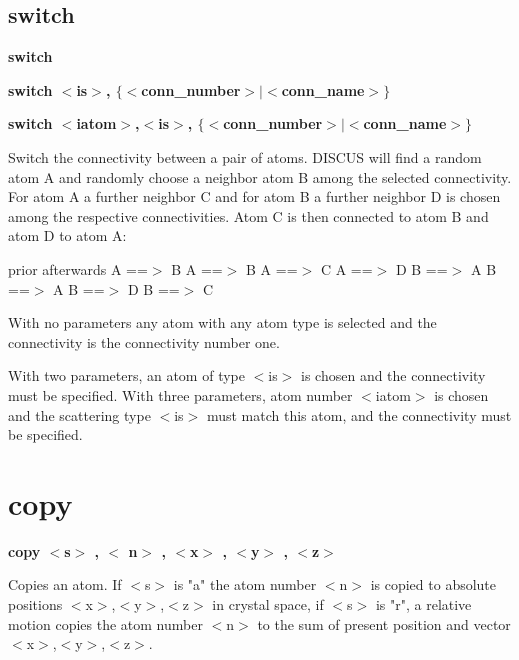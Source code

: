 \subsection*{switch}
{\bf switch \par }
{\bf switch $ <$is$> $, $ \{$$ <$conn\_number$> $$| $$ <$conn\_name$> $$\} $ \par }
{\bf switch $ <$iatom$> $,$ <$is$> $, $ \{$$ <$conn\_number$> $$| $$ <$conn\_name$> $$\} $ \par }
\par
\vspace{3pt}
Switch the connectivity between a pair of atoms. 
DISCUS will find a random atom A and randomly choose a neighbor 
atom B among the selected connectivity. For atom A a further 
neighbor C and for atom B a further neighbor D is chosen among 
the respective connectivities. Atom C is then connected to 
atom B and atom D to atom A: 
\par
prior     afterwards 
A ==$> $ B   A ==$> $ B 
A ==$> $ C   A ==$> $ D 
B ==$> $ A   B ==$> $ A 
B ==$> $ D   B ==$> $ C 
\par
With no parameters any atom with any atom type is selected and 
the connectivity is the connectivity number one. 
\par
With two parameters, an atom of type $ <$is$> $ is chosen and the 
connectivity must be specified. 
With three parameters, atom number $ <$iatom$> $ is chosen and the 
scattering type $ <$is$> $ must match this atom, and the 
connectivity must be specified. 
\section{copy}
{\bf copy $ <$s$> $ , $ <$ n$> $ , $ <$x$> $ , $ <$y$> $ , $ <$z$> $ \par }
\par
\vspace{3pt}
Copies an atom. If $ <$s$> $ is "a" the atom number $ <$n$> $ is copied to 
absolute positions $ <$x$> $,$ <$y$> $,$ <$z$> $ in crystal space, if $ <$s$> $ is "r", a 
relative motion copies the atom number $ <$n$> $ to the sum of present 
position and vector $ <$x$> $,$ <$y$> $,$ <$z$> $. 
